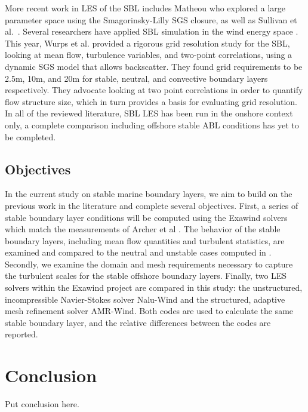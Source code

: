\documentclass[conf]{new-aiaa}
\begin{document}
More recent work in LES of the SBL includes Matheou \cite{Matheou2016} who 
explored a large parameter space using the Smagorinsky-Lilly SGS 
closure, as well as Sullivan et al.\ \cite{sullivan2016turbulent}. Several researchers 
have applied SBL simulation in the wind energy space \cite{Aitken2014, Abkar2015, Ghaisas2017}. 
This year, Wurps et al. \cite{Wurps2020} provided a rigorous grid resolution study for the SBL, 
looking at mean flow, turbulence variables, and two-point correlations, using a dynamic 
SGS model that allows backscatter. They found grid requirements to be 2.5m, 10m, and 20m 
for stable, neutral, and convective boundary layers respectively. They advocate looking 
at two point correlations in order to quantify flow structure size, which in turn 
provides a basis for evaluating grid resolution. In all of the reviewed literature, SBL LES 
has been run in the onshore context only, a complete comparison
including offshore stable ABL conditions has yet to be completed.



\subsection{Objectives}
In the current study on stable marine boundary layers, we aim to build
on the previous work in the literature and complete several
objectives.  First, a series of stable boundary layer conditions will
be computed using the Exawind solvers which match the measurements of
Archer et al \cite{archer2016predominance}.  The behavior of the
stable boundary layers, including mean flow quantities and turbulent
statistics, are examined and compared to the neutral and unstable
cases computed in \cite{cheung2020large}.  Secondly, we examine the
domain and mesh requirements necessary to capture the turbulent scales
for the stable offshore boundary layers.  Finally, two LES solvers
within the Exawind project are compared in this study: the
unstructured, incompressible Navier-Stokes solver Nalu-Wind and the
structured, adaptive mesh refinement solver AMR-Wind.  Both codes are
used to calculate the same stable boundary layer, and the relative
differences between the codes are reported.





\section{Conclusion}
Put conclusion here.
\end{document}
